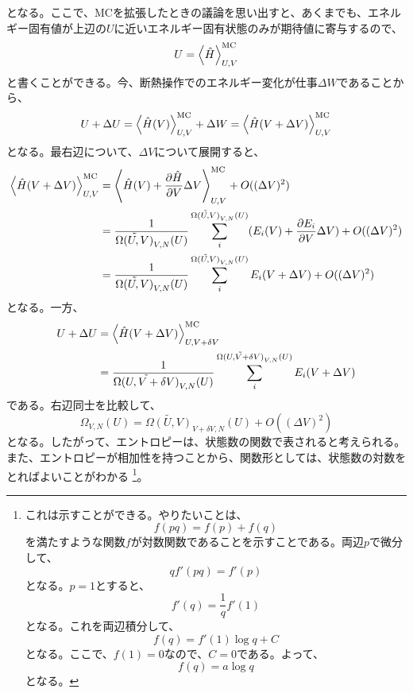 \documentclass[a4paper,11pt]{jsarticle}
\numberwithin{equation}{section}
\begin{document}
となる。ここで、MCを拡張したときの議論を思い出すと、あくまでも、エネルギー固有値が上辺の$U$に近いエネルギー固有状態のみが期待値に寄与するので、
\begin{equation}
  U = \expval{\hat{H}}_{U,V}^{\text{MC}}
\end{equation}
と書くことができる。今、断熱操作でのエネルギー変化が仕事$\Delta W$であることから、
\begin{equation}
  U + \Delta U = \expval{\hat{H}(V)}_{U,V}^{\text{MC}} + \Delta W = \expval{\hat{H}(V+\Delta V)}_{U,V}^{\text{MC}}
\end{equation}
となる。最右辺について、$\Delta V$について展開すると、
\begin{align}
  \expval{\hat{H}(V+\Delta V)}_{U,V}^{\text{MC}} &= \expval{\hat{H}(V) + \pdv{\hat{H}}{V}\Delta V}_{U,V}^{\text{MC}} + O((\Delta V)^2)\\
  &= \frac{1}{\tilde{\Omega(U,V)}_{V,N}(U)}\sum_{i}^{\tilde{\Omega(U,V)}_{V,N}(U)} (E_i(V) + \pdv{E_i}{V}\Delta V) + O((\Delta V)^2)\\
  &= \frac{1}{\tilde{\Omega(U,V)}_{V,N}(U)}\sum_{i}^{\tilde{\Omega(U,V)}_{V,N}(U)} E_i(V+\Delta V) + O((\Delta V)^2)
\end{align}
となる。一方、
\begin{align}
  U + \Delta U &= \expval{\hat{H}(V+\Delta V)}_{U,V+\delta V}^{\text{MC}}\\
  &= \frac{1}{\tilde{\Omega(U,V+\delta V)}_{V,N}(U)}\sum_{i}^{\tilde{\Omega(U,V+\delta V)}_{V,N}(U)} E_i(V+\Delta V) 
\end{align}
である。右辺同士を比較して、
\begin{equation}
  \Omega_{V,N}(U) = \tilde{\Omega(U,V)}_{V+\delta V,N}(U) + O((\Delta V)^2)
\end{equation}
となる。したがって、エントロピーは、状態数の関数で表されると考えられる。\\
また、エントロピーが相加性を持つことから、関数形としては、状態数の対数をとればよいことがわかる
\footnote{これは示すことができる。やりたいことは、
\begin{equation}
  f(pq) = f(p) + f(q)
\end{equation}
を満たすような関数$f$が対数関数であることを示すことである。両辺$p$で微分して、
\begin{equation}
  qf'(pq) = f'(p)
\end{equation}
となる。$p=1$とすると、
\begin{equation}
  f'(q) = \frac{1}{q}f'(1)
\end{equation}
となる。これを両辺積分して、
\begin{equation}
  f(q) = f'(1)\log q + C
\end{equation}
となる。ここで、$f(1)=0$なので、$C=0$である。よって、
\begin{equation}
  f(q) = a \log q
\end{equation}
となる。}。
\end{document}
